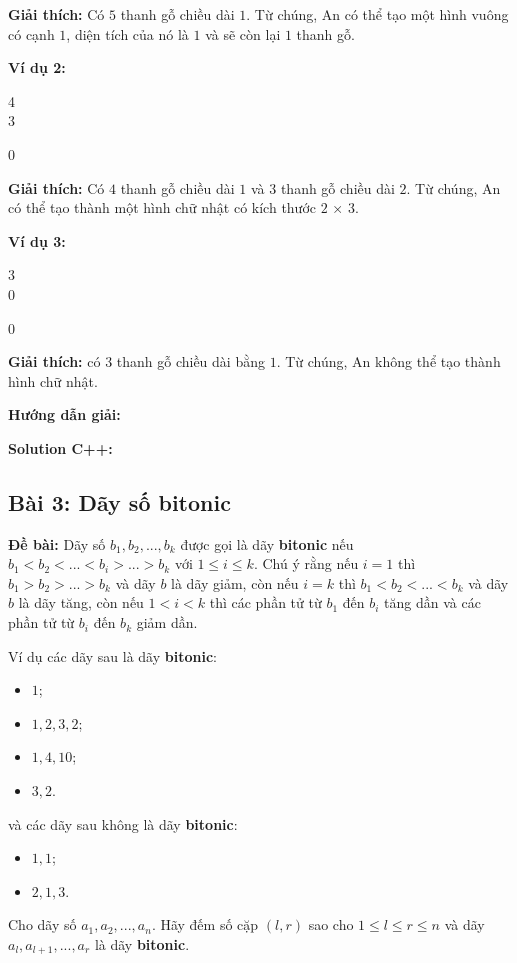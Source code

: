 \documentclass[12pt]{scrartcl}  %
\begin{document}
\textbf{Giải thích:}
Có $5$ thanh gỗ chiều dài $1$. Từ chúng, An có thể tạo một hình vuông có cạnh $1$, diện tích của nó là $1$ và sẽ còn lại $1$ thanh gỗ.

\textbf{Ví dụ 2:}
\begin{tcolorbox}[colback=gray!5!white, colframe=blue!50!black, title=Input]
4\\
3
\end{tcolorbox}
\begin{tcolorbox}[colback=gray!5!white, colframe=green!50!black, title=Output]
0
\end{tcolorbox}
\textbf{Giải thích:}
Có $4$ thanh gỗ chiều dài $1$ và $3$ thanh gỗ chiều dài $2$. Từ chúng, An có thể tạo thành một hình chữ nhật có kích thước $2$ × $3$.

\textbf{Ví dụ 3:}
\begin{tcolorbox}[colback=gray!5!white, colframe=blue!50!black, title=Input]
3\\
0
\end{tcolorbox}
\begin{tcolorbox}[colback=gray!5!white, colframe=green!50!black, title=Output]
0
\end{tcolorbox}
\textbf{Giải thích:}
có $3$ thanh gỗ chiều dài bằng $1$. Từ chúng, An không thể tạo thành hình chữ nhật.

\textbf{Hướng dẫn giải:}

\textbf{Solution C++:}

\subsection{Bài 3: Dãy số bitonic}
\textbf{Đề bài:}
Dãy số $b_1, b_2, ... , b_k$ được gọi là dãy \textbf{bitonic} nếu $b_1 < b_2 < ... < b_i > ... > b_k$ với $1 \leq i \leq k$. Chú ý rằng nếu $i = 1$ thì $b_1 > b_2 > ... > b_k$ và dãy $b$ là dãy giảm, còn nếu $i = k$ thì $b_1 < b_2 < ... < b_k$ và dãy $b$ là dãy tăng, còn nếu $1 < i < k$ thì các phần tử từ $b_1$ đến $b_i$ tăng dần và các phần tử từ $b_i$ đến $b_k$ giảm dần.

Ví dụ các dãy sau là dãy \textbf{bitonic}:
\begin{itemize}
    \item $1$;
    \item $1, 2, 3, 2$;
    \item $1, 4, 10$;
    \item $3, 2$.
\end{itemize}
và các dãy sau không là dãy \textbf{bitonic}:
\begin{itemize}
    \item $1, 1$;
    \item $2, 1, 3$.
\end{itemize}
Cho dãy số $a_1, a_2, ... , a_n$. Hãy đếm số cặp $(l, r)$ sao cho $1 \leq l \leq r \leq n$ và dãy $a_l, a_{l + 1}, ..., a_r$ là dãy \textbf{bitonic}.
\end{document}

